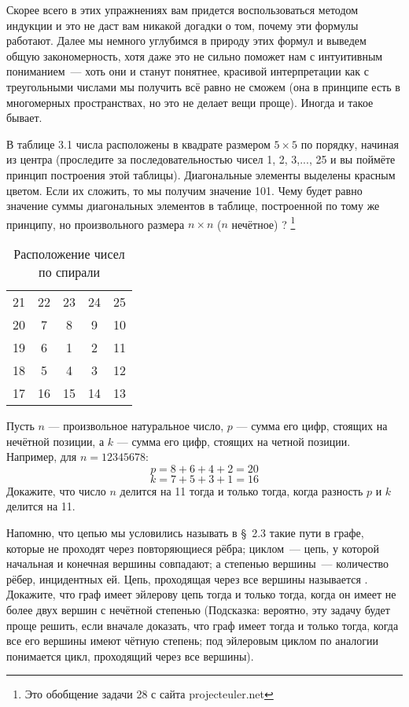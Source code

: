 Скорее всего в этих упражнениях вам придется воспользоваться методом индукции и это не даст вам никакой догадки о том, почему эти формулы работают. Далее мы немного углубимся в природу этих формул и выведем общую закономерность, хотя даже это не сильно поможет нам с интуитивным пониманием~--- хоть они и станут понятнее, красивой интерпретации как с треугольными числами мы получить всё равно не сможем (она в принципе есть в многомерных пространствах, но это не делает вещи проще). Иногда и такое бывает.

\begin{exercise}
В таблице 3.1 числа расположены в квадрате размером $5\times 5$ по порядку, начиная из центра (проследите за последовательностью чисел 1, 2, 3,..., 25 и вы поймёте принцип построения этой таблицы). Диагональные элементы выделены красным цветом. Если их сложить, то мы получим значение 101. Чему будет равно значение суммы диагональных элементов в таблице, построенной по тому же принципу, но произвольного размера $n\times n$ ($n$ нечётное) ?
\footnote{Это обобщение задачи 28 с сайта projecteuler.net}
\end{exercise}

\begin{table}[h]
\centering
\begin{tabular}{ccccc}
{\color{red} 21} &22& 23& 24& {\color{red} 25}\\
20 & {\color{red} 7} & 8 & {\color{red} 9}& 10\\
19 & 6&  {\color{red} 1}&  2& 11\\
18 & {\color{red} 5} & 4 & {\color{red} 3}& 12\\
{\color{red} 17}& 16& 15& 14& {\color{red} 13}
\end{tabular}
\caption{Расположение чисел по спирали}
\end{table}

\begin{exercise}
Пусть $n$ --- произвольное натуральное число, $p$ --- сумма его цифр, стоящих на нечётной позиции, а $k$ --- сумма его цифр, стоящих на четной позиции. Например, для $n=12345678$:
$$p=8+6+4+2 = 20$$
$$k=7+5+3+1 = 16$$
Докажите, что число $n$ делится на 11 тогда и только тогда, когда разность $p$ и $k$ делится на 11.
\end{exercise}

\begin{exercise}
Напомню, что цепью мы условились называть в \S~2.3 такие пути в графе, которые не проходят через повторяющиеся рёбра; циклом~--- цепь, у которой начальная и конечная вершины совпадают; а степенью вершины~--- количество рёбер, инцидентных ей. Цепь, проходящая через все вершины называется . Докажите, что граф имеет эйлерову цепь тогда и только тогда, когда он имеет не более двух вершин с нечётной степенью (Подсказка: вероятно, эту задачу будет проще решить, если вначале доказать, что граф имеет  тогда и только тогда, когда все его вершины имеют чётную степень; под эйлеровым циклом по аналогии понимается цикл, проходящий через все вершины).
\end{exercise}

